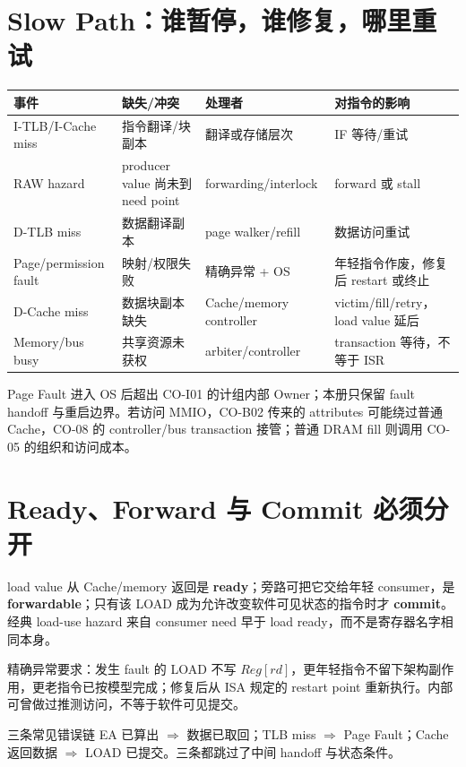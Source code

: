 \documentclass[UTF8,fontset=fandol,11pt,a4paper]{ctexart}
\newcommand{\kw}[1]{\textbf{\color{deep}#1}}
\begin{document}
\section{Slow Path：谁暂停，谁修复，哪里重试}
\begin{center}\small
\begin{tabularx}{\linewidth}{L{2.1cm}L{2.2cm}YY}\toprule
事件 & 缺失/冲突 & 处理者 & 对指令的影响\\\midrule
I-TLB/I-Cache miss & 指令翻译/块副本 & 翻译或存储层次 & IF 等待/重试\\
RAW hazard & producer value 尚未到 need point & forwarding/interlock & forward 或 stall\\
D-TLB miss & 数据翻译副本 & page walker/refill & 数据访问重试\\
Page/permission fault & 映射/权限失败 & 精确异常 + OS & 年轻指令作废，修复后 restart 或终止\\
D-Cache miss & 数据块副本缺失 & Cache/memory controller & victim/fill/retry，load value 延后\\
Memory/bus busy & 共享资源未获权 & arbiter/controller & transaction 等待，不等于 ISR\\
\bottomrule
\end{tabularx}
\end{center}

Page Fault 进入 OS 后超出 CO-I01 的计组内部 Owner；本册只保留 fault handoff 与重启边界。若访问 MMIO，CO-B02 传来的 attributes 可能绕过普通 Cache，CO-08 的 controller/bus transaction 接管；普通 DRAM fill 则调用 CO-05 的组织和访问成本。

\section{Ready、Forward 与 Commit 必须分开}
load value 从 Cache/memory 返回是 \kw{ready}；旁路可把它交给年轻 consumer，是 \kw{forwardable}；只有该 LOAD 成为允许改变软件可见状态的指令时才 \kw{commit}。经典 load-use hazard 来自 consumer need 早于 load ready，而不是寄存器名字相同本身。

精确异常要求：发生 fault 的 LOAD 不写 $Reg[rd]$，更年轻指令不留下架构副作用，更老指令已按模型完成；修复后从 ISA 规定的 restart point 重新执行。内部可曾做过推测访问，不等于软件可见提交。

\begin{warnbox}{三条常见错误链}
EA 已算出 $\Rightarrow$ 数据已取回；TLB miss $\Rightarrow$ Page Fault；Cache 返回数据 $\Rightarrow$ LOAD 已提交。三条都跳过了中间 handoff 与状态条件。
\end{warnbox}
\end{document}
